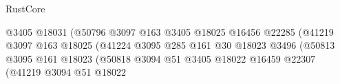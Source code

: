 \begin{lexlean}{RustCore}
\begin{coremodule}
                                                              @3405
                                                              @18031
                                                              (@50796
                                                                @3097
                                                                @163
                                                                @3405
                                                                @18025
                                                                @16456
                                                                @22285
                                                                (@41219
                                                                  @3097
                                                                  @163
                                                                  @18025
                                                                  (@41224
                                                                    @3095
                                                                    @285
                                                                    @161
                                                                    @30
                                                                    @18023
                                                                    @3496
                                                                    (@50813
                                                                      @3095
                                                                      @161
                                                                      @18023
                                                                      (@50818
                                                                        @3094
                                                                        @51
                                                                        @3405
                                                                        @18022
                                                                        @16459
                                                                        @22307
                                                                        (@41219
                                                                          @3094
                                                                          @51
                                                                          @18022

\end{coremodule}
\end{lexlean}
